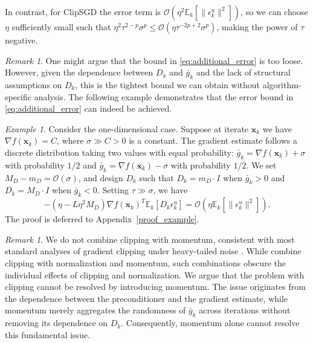 \documentclass{article}
\newcommand{\bx}{\boldsymbol{x}}
\newcommand{\barg}{\bar{g}}
\theoremstyle{plain}
\theoremstyle{definition}
\theoremstyle{remark}
\newtheorem{remark}[theorem]{Remark}
\newtheorem{example}[theorem]{Example}
\begin{document}
In contrast, for ClipSGD the error term is $\mathcal{O}(\eta^2\mathbb{E}_k[\|\epsilon_k^u\|^2])$, so we can choose $\eta$ sufficiently small such that $\eta^2\tau^{2-p}\sigma^p \leq \mathcal{O}(\eta\tau^{-2p+2}\sigma^p)$, making the power of $\tau$ negative.

\begin{remark}
One might argue that the bound in \eqref{eq:additional_error} is too loose. However, given the dependence between $D_k$ and $\barg_k$ and the lack of structural assumptions on $D_k$, this is the tightest bound we can obtain without algorithm-specific analysis. The following example demonstrates that the error bound in \eqref{eq:additional_error} can indeed be achieved.

\begin{example}\label{example}
Consider the one-dimensional case. Suppose at iterate $\bx_k$ we have $\nabla f(\bx_k) = C$, where $\sigma\gg C>0$ is a constant. The gradient estimate follows a discrete distribution taking two values with equal probability: $ \barg_k = \nabla f(\bx_k) + \sigma$ with probability $1/2$ and $\barg_k = \nabla f(\bx_k) - \sigma$ with probability $1/2$. We set $M_D-m_D=\mathcal{O}(\sigma)$, and design $D_k$ such that $D_k = m_D \cdot I$ when $\barg_k > 0$ and $D_k = M_D \cdot I$ when $\barg_k < 0$. Setting $\tau \gg \sigma$, we have
\begin{equation*}
    -(\eta - L\eta^2 M_D)\nabla f(\bx_k)^T\mathbb{E}_k[D_k\epsilon_k^u] = \mathcal{O}(\eta\mathbb{E}_k[\|\epsilon_k^u\|^2]).
\end{equation*}
The proof is deferred to Appendix~\ref{proof_example}.
\end{example}
\end{remark}

\begin{remark}\label{remark:momentum}
We do not combine clipping with momentum, consistent with most standard analyses of gradient clipping under heavy-tailed noise \citep{Zhang2020Adaptive,Puchkin2024Breaking,Sadiev2023High,nguyen2023improved}. While \citet{Sun2025Revisiting} combine clipping with normalization and momentum, such combinations obscure the individual effects of clipping and normalization. We argue that the problem with clipping cannot be resolved by introducing momentum. The issue originates from the dependence between the preconditioner and the gradient estimate, while momentum merely aggregates the randomness of $\barg_k$ across iterations without removing its dependence on $D_k$. Consequently, momentum alone cannot resolve this fundamental issue.
\end{remark}
\end{document}
